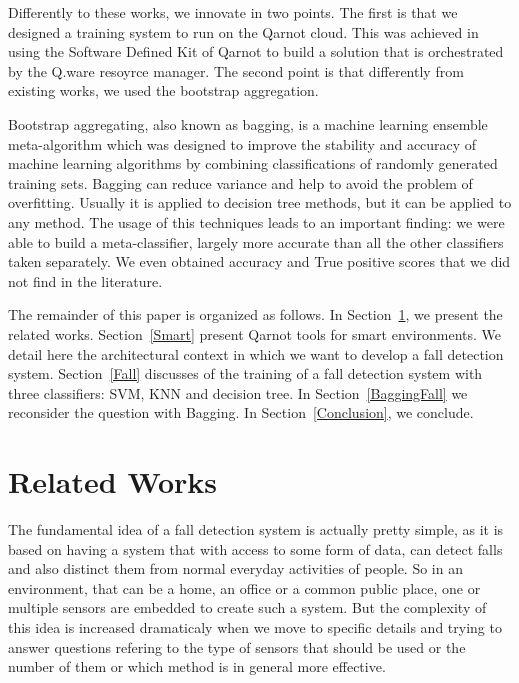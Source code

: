 \documentclass[10pt, conference, compsocconf]{IEEEtran}
\begin{document}
Differently to these works, we innovate in two points. The first is that we designed a training system to run on 
the Qarnot cloud. This was achieved in using the Software Defined Kit of Qarnot to build a solution that is orchestrated by 
the Q.ware resoyrce manager. The second point is that differently from existing works, we used the  bootstrap aggregation. 

Bootstrap aggregating, also known as bagging, is a machine learning ensemble meta-algorithm which was designed to improve the stability and accuracy of machine learning algorithms by combining classifications of randomly generated training sets. Bagging can reduce variance and help to avoid the problem of overfitting. Usually it is applied to decision tree methods, but it can be applied to any method. The usage of this techniques leads to an important finding: we were able to build a meta-classifier, 
largely more accurate than all the other classifiers taken separately. We even obtained accuracy and True positive scores that 
we did not find in the literature. 

The remainder of this paper is organized as follows. In Section~\ref{Related}, we present the related works. Section~\ref{Smart} 
present Qarnot tools for smart environments. We detail here the architectural context in which we want to develop a fall 
detection system. Section~\ref{Fall} discusses of the training of a fall detection system with three classifiers: SVM, KNN and decision tree. 
In Section~\ref{BaggingFall} we reconsider the question with Bagging. In Section~\ref{Conclusion}, we conclude.

\section{Related Works} \label{Related}

The fundamental idea of a fall detection system is actually pretty simple, as it is based on having a system that with access to some form of data, can detect falls and also distinct them from normal everyday activities of people. So in an environment, that can be a home, an office or a common public place, one or multiple sensors are embedded to create such a system. But the complexity of this idea is increased dramaticaly when we move to specific details and trying to answer questions refering to the type of sensors that should be used or the number of them or which method is in general more effective. 
\end{document}
